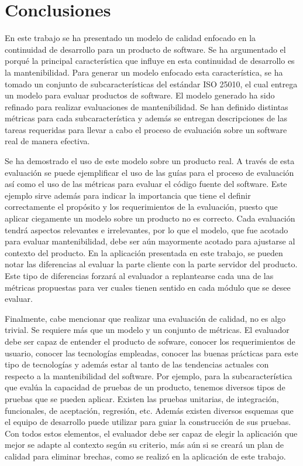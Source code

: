 \chapter{Conclusiones}
\label{chap:conclusiones}

En este trabajo se ha presentado un modelo de calidad enfocado en la continuidad
de desarrollo para un producto de software. Se ha argumentado el porqué la principal característica
que influye en esta continuidad de desarrollo es la mantenibilidad.
Para generar un modelo enfocado esta característica, se ha tomado un conjunto
de subcaracterísticas del estándar ISO 25010, el cual entrega un modelo para
evaluar productos de software. El modelo generado ha sido
refinado para realizar evaluaciones de mantenibilidad. Se han
definido distintas métricas para cada subcaracterística y además se entregan
descripciones de las tareas requeridas para llevar a cabo el proceso de evaluación
sobre un software real de manera efectiva.

Se ha demostrado el uso de este modelo sobre un producto real. A través de esta
evaluación se puede ejemplificar el uso de las guías para el proceso de evaluación
así como el uso de las métricas para evaluar el código fuente del software.
Este ejemplo sirve además para indicar la importancia que tiene el definir correctamente
el propósito y los requerimientos de la evaluación, puesto que aplicar
ciegamente un modelo sobre un producto no es correcto. Cada evaluación tendrá
aspectos relevantes e irrelevantes, por lo que el modelo, que fue acotado
para evaluar mantenibilidad, debe ser aún mayormente acotado para ajustarse
al contexto del producto. En la aplicación presentada en este trabajo, se pueden
notar las diferencias al evaluar la parte cliente con la parte servidor del producto.
Este tipo de diferencias forzará al evaluador a replantearse cada una de las métricas
propuestas para ver cuales tienen sentido en cada módulo que se desee evaluar.

Finalmente, cabe mencionar que realizar una evaluación de calidad, no es algo trivial.
Se requiere más que un modelo y un conjunto de métricas. El evaluador debe ser
capaz de entender el producto de sofware, conocer los requerimientos de usuario,
conocer las tecnologías empleadas, conocer las buenas prácticas para este tipo
de tecnologías y además estar al tanto de las tendencias actuales con respecto
a la mantenibilidad del software. Por ejemplo, para la subcaracterística
que evalúa la capacidad de pruebas de un producto, tenemos diversos tipos
de pruebas que se pueden aplicar. Existen las pruebas unitarias, de integración,
funcionales, de aceptación, regresión, etc. Además existen diversos esquemas
que el equipo de desarrollo puede utilizar para guiar la construcción de sus pruebas.
Con todos estos elementos, el evaluador debe ser capaz de elegir la aplicación
que mejor se adapte al contexto según su criterio, más aún si se creará un plan
de calidad para eliminar brechas, como se realizó en la aplicación de este trabajo.

